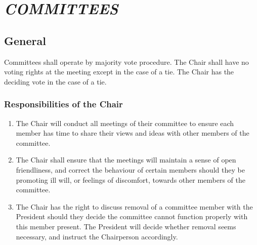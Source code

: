 


% 

\hypertarget{committees}{%
 \section{\texorpdfstring{\emph{COMMITTEES}}{COMMITTEES}}
 \label{committees}}

\hypertarget{committees-general}{%
 \subsection{General}
 \label{committees-general}}
Committees shall operate by majority vote procedure. The Chair shall
have no voting rights at the meeting except in the case of a tie. The
Chair has the deciding vote in the case of a tie.

\hypertarget{responsibilities-of-the-chair}{%
 \subsubsection{Responsibilities of the
  Chair}
 \label{responsibilities-of-the-chair}}

\begin{enumerate}
 \item
  The Chair will conduct all meetings of their committee to ensure each
  member has time to share their views and ideas with other members of
  the committee.
 \item
  The Chair shall ensure that the meetings will maintain a sense of open
  friendliness, and correct the behaviour of certain members should they
  be promoting ill will, or feelings of discomfort, towards other
  members of the committee.
 \item
  The Chair has the right to discuss removal of a committee member with
  the President should they decide the committee cannot function
  properly with this member present. The President will decide whether
  removal seems necessary, and instruct the Chairperson accordingly.
\end{enumerate}

